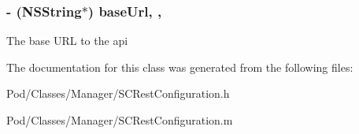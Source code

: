\subsubsection[{\texorpdfstring{base\+Url}{baseUrl}}]{\setlength{\rightskip}{0pt plus 5cm}-\/ (N\+S\+String$\ast$) base\+Url\hspace{0.3cm}{\ttfamily [read]}, {\ttfamily [nonatomic]}, {\ttfamily [retain]}}\hypertarget{interface_s_c_rest_configuration_ab62562b47f88f8e01a6f0573cab8b053}{}\label{interface_s_c_rest_configuration_ab62562b47f88f8e01a6f0573cab8b053}
The base U\+RL to the api 

The documentation for this class was generated from the following files\+:\begin{DoxyCompactItemize}
\item 
Pod/\+Classes/\+Manager/S\+C\+Rest\+Configuration.\+h\item 
Pod/\+Classes/\+Manager/S\+C\+Rest\+Configuration.\+m\end{DoxyCompactItemize}
